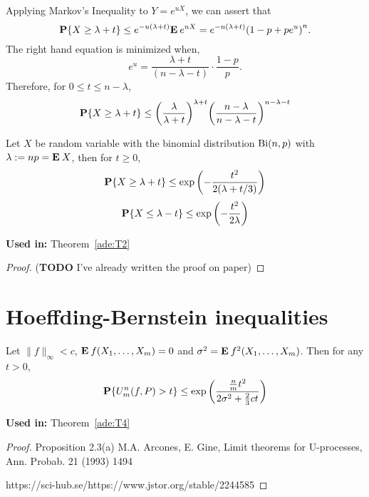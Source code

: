 Applying Markov's Inequality to $Y = e^{uX}$, we can assert that
  \[
    \P\{X \geq \lambda + t\} \leq e^{-u(\lambda+t)} \E e^{uX} = e^{-u(\lambda+ t)} {(1-p + p e^{u})}^n. 
  \] 
  The right hand equation is minimized when,
  \[ e^{u} = \frac{\lambda+t}{(n-\lambda-t)} \cdot \frac{1-p}{p}. \]
  Therefore, for $0 \leq t \leq n-\lambda$,
  \begin{equation}\label{co:1}
    \P\{X \geq \lambda + t\} \leq {\left(\frac{\lambda}{\lambda+t}\right)}^{\lambda + t} {\left(\frac{n-\lambda}{n-\lambda-t}\right)}^{n - \lambda - t}
  \end{equation}

\begin{theorem}\label{co:T1}
  Let $X$ be random variable with the binomial distribution $\Bi(n,p)$ with $\lambda := np = \E X$, then for $t \geq 0$,
  \begin{equation}\label{co:2}
    \P\{X \geq \lambda + t\} \leq \exp\left(- \frac{t^2}{2(\lambda+t/3)}\right)
  \end{equation}
  \begin{equation}\label{co:3}
    \P\{X \leq \lambda - t\} \leq \exp\left(- \frac{t^2}{2\lambda}\right)
  \end{equation}
\end{theorem}

\textbf{Used in:} Theorem~\ref*{ade:T2}

\begin{proof}
  (\textbf{TODO} I've already written the proof on paper)
\end{proof}

\section{Hoeffding-Bernstein inequalities}

\begin{theorem}\label{hb:T1}
  Let $\|f\|_\infty < c$, $\E f(X_1,\ldots, X_m) = 0$ and $\sigma^2 = \E f^2(X_1,\ldots, X_m)$. Then for any $t > 0$,
  \begin{equation}
    \P\{U_m^n(f,P) > t\} \leq \exp \left(\dfrac{\tfrac{n}{m}t^2}{2\sigma^2 + \tfrac{2}{3}ct}\right)
  \end{equation}
\end{theorem}

\textbf{Used in:} Theorem~\ref*{ade:T4}

\begin{proof}
  Proposition 2.3(a) M.A. Arcones, E. Gine, Limit theorems for U-processes, Ann. Probab. 21 (1993) 1494 
  
  https://sci-hub.se/https://www.jstor.org/stable/2244585
\end{proof}